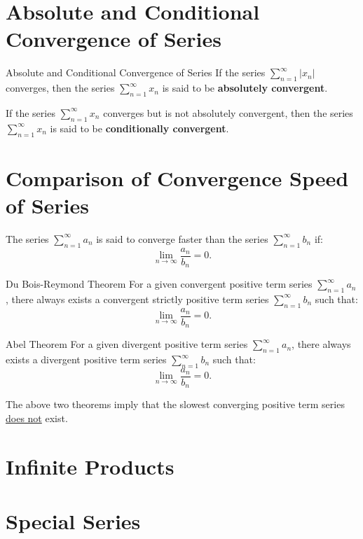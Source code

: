 \documentclass[11pt]{../../TexTemplate/elegantbook}
\begin{document}
\section{Absolute and Conditional Convergence of Series}
\begin{definition}{Absolute and Conditional Convergence of Series}
    If the series \( \sum_{n=1}^{\infty} |x_n| \) converges, 
    then the series \( \sum_{n=1}^{\infty} x_n \) is said to be \textbf{absolutely convergent}.

    If the series \( \sum_{n=1}^{\infty} x_n \) converges but is not absolutely convergent, 
    then the series \( \sum_{n=1}^{\infty} x_n \) is said to be \textbf{conditionally convergent}.
\end{definition}

\section{Comparison of Convergence Speed of Series}
The series \( \sum_{n=1}^{\infty} a_n \) is said to converge faster than the series \( \sum_{n=1}^{\infty} b_n \) if:
\[
\lim_{n \to \infty} \frac{a_n}{b_n} = 0.
\]

\begin{theorem}{Du Bois-Reymond Theorem}
    For a given convergent positive term series \( \sum_{n=1}^{\infty} a_n \), there always exists a convergent strictly positive term series \( \sum_{n=1}^{\infty} b_n \) such that:
    \[
    \lim_{n \to \infty} \frac{a_n}{b_n} = 0.
    \]
\end{theorem}

\begin{theorem}{Abel Theorem}
    For a given divergent positive term series \( \sum_{n=1}^{\infty} a_n \), there always exists a divergent positive term series \( \sum_{n=1}^{\infty} b_n \) such that:
    \[
    \lim_{n \to \infty} \frac{a_n}{b_n} = 0.
    \]
\end{theorem}

\begin{remark}
    The above two theorems imply that the slowest converging positive term series \underline{does not} exist.
\end{remark}



\section{Infinite Products}

\section{Special Series}
\end{document}
